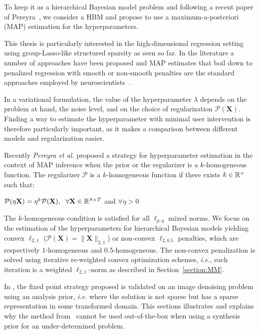 To keep it as a hierarchical Bayesian model problem and following a recent paper of Pereyra~\cite{Figueiredo}, we consider a HBM and propose to use a maximum-a-posteriori (MAP) estimation for the hyperparameters.

This thesis is particularly interested in the high-dimensional regression setting using group-Lasso-like structured sparsity as seen so far. In the literature a number of approaches have been proposed and MAP estimates that boil down to penalized regression with smooth or non-smooth penalties are the standard approaches employed by neuroscientists~\cite{haufe2008combining,ou2009distributed, bolstad2009space, wipf2009unified,gramfort2012mixed,lucka2012hierarchical,valdes2009eeg}.

In a variational formulation, the value of the hyperparameter $\lambda$ depends on the problem at hand, the noise level, and on the choice of regularization $\mathcal{P}(\mathbf{X})$.
Finding a way to estimate the hyperparameter with minimal user intervention is therefore particularly important, as it makes a comparison between different models and regularization easier.

Recently \textit{Pereyra et al.} \cite{Figueiredo} proposed a strategy for hyperparameter estimation in the context of MAP inference when the prior or the regularizer is a $k$-homogeneous function. The regularizer $\mathcal{P}$ is a $k$-homogeneous function if there exists $k\in\mathbb{R}^+$ such that:\\
\begin{center}
 $\mathcal{P}(\eta \mathbf{X}) = \eta^k\mathcal{P}(\mathbf{X}),
 \hspace{6pt} \forall \mathbf{X}\in\mathbb{R}^{S\times T}$  \hspace{4pt} and \hspace{4pt}  $\forall \eta > 0$
 \end{center}

The $k$-homogeneous condition is satisfied for all $\ell_{p,q}$ mixed norms. We focus on the estimation of the hyperparameters for hierarchical Bayesian models yielding convex $\ell_{2,1}$ ($\mathcal{P}(\mathbf{X})=\|\mathbf{X}\|_{2,1}$) or non-convex $\ell_{2,0.5}$ penalties, which are respectively $1$-homogeneous and $0.5$-homogeneous. The non-convex penalization is solved using iterative re-weighted convex optimization schemes, \textit{i.e.}, each iteration is a weighted $\ell_{2,1}$-norm as described in Section~\ref{section:MM}.

In \cite{Figueiredo}, the fixed point strategy proposed is validated on an image denoising problem using an analysis prior, \textit{i.e.} where the solution is not sparse but has a sparse representation in some transformed domain. This sections illustrates and explains why the method from~\cite{Figueiredo} cannot be used out-of-the-box when using a synthesis prior for an under-determined problem.

